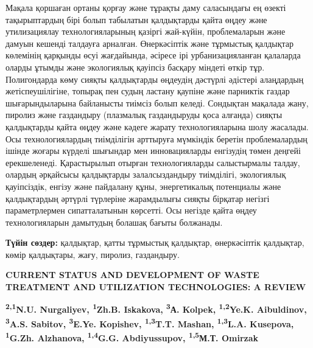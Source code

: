 Мақала қоршаған ортаны қорғау және тұрақты даму саласындағы ең өзекті
тақырыптардың бірі болып табылатын қалдықтарды қайта өңдеу және
утилизациялау технологияларының қазіргі жай-күйін, проблемаларын және
дамуын кешенді талдауға арналған. Өнеркәсіптік және тұрмыстық қалдықтар
көлемінің қарқынды өсуі жағдайында, әсіресе ірі урбанизацияланған
қалаларда оларды ұтымды және экологиялық қауіпсіз басқару міндеті өткір
тұр. Полигондарда көму сияқты қалдықтарды өңдеудің дәстүрлі әдістері
алаңдардың жетіспеушілігіне, топырақ пен судың ластану қаупіне және
парниктік газдар шығарындыларына байланысты тиімсіз болып келеді.
Сондықтан мақалада жану, пиролиз және газдандыру (плазмалық газдандыруды
қоса алғанда) сияқты қалдықтарды қайта өңдеу және кәдеге жарату
технологияларына шолу жасалады. Осы технологиялардың тиімділігін
арттыруға мүмкіндік беретін проблемалардың ішінде жоғары күрделі
шығындар мен инновацияларды енгізудің төмен деңгейі ерекшеленеді.
Қарастырылып отырған технологияларды салыстырмалы талдау, олардың
әрқайсысы қалдықтарды залалсыздандыру тиімділігі, экологиялық
қауіпсіздік, енгізу және пайдалану құны, энергетикалық потенциалы және
қалдықтардың әртүрлі түрлеріне жарамдылығы сияқты бірқатар негізгі
параметрлермен сипатталатынын көрсетті. Осы негізде қайта өңдеу
технологияларын дамытудың болашақ бағыты болжанады.

{\bfseries Түйін сөздер:} қалдықтар, қатты тұрмыстық қалдықтар,
өнеркәсіптік қалдықтар, көмір қалдықтары, жағу, пиролиз, газдандыру.

\begin{articleheader}
{\bfseries CURRENT STATUS AND DEVELOPMENT OF WASTE TREATMENT AND UTILIZATION TECHNOLOGIES: A REVIEW}

{\bfseries
\textsuperscript{2,1}N.U. Nurgaliyev\textsuperscript{\envelope },
\textsuperscript{1}Zh.B. Iskakova\textsuperscript{\envelope },
\textsuperscript{3}А. Kolpek,
\textsuperscript{1,2}Ye.K. Aibuldinov\textsuperscript{\envelope },
\textsuperscript{3}A.S. Sabitov,
\textsuperscript{3}E.Ye. Kopishev,
\textsuperscript{1,3}T.T. Mashan,
\textsuperscript{1,3}L.A. Kusepova,
\textsuperscript{1}G.Zh. Alzhanova,
\textsuperscript{1,4}G.G. Abdiyussupov,
\textsuperscript{1,5}М.Т. Omirzak
}
\end{articleheader}

